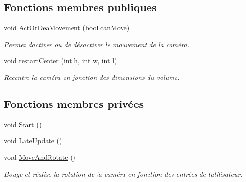 \subsection*{Fonctions membres publiques}
\begin{DoxyCompactItemize}
\item 
void \mbox{\hyperlink{class_camera_control_a879e70766aaa6eec8be532ab6712dd6b}{Act\+Or\+Dea\+Movement}} (bool \mbox{\hyperlink{class_camera_control_a0c3fa77bacbeb5a6735e6d572dbbce67}{can\+Move}})
\begin{DoxyCompactList}\small\item\em Permet d\textquotesingle{}activer ou de désactiver le mouvement de la caméra. \end{DoxyCompactList}\item 
void \mbox{\hyperlink{class_camera_control_ab7238445e22d5a0d5c2f620f1ad46fa2}{restart\+Center}} (int \mbox{\hyperlink{class_camera_control_aee06e1c0a46ffd42fcd8abe1c2f5a40a}{h}}, int \mbox{\hyperlink{class_camera_control_a4080a1d529cac09e1384bb0420ba87d3}{w}}, int \mbox{\hyperlink{class_camera_control_a0e883a505f663ed202947cb60995ded6}{l}})
\begin{DoxyCompactList}\small\item\em Recentre la caméra en fonction des dimensions du volume. \end{DoxyCompactList}\end{DoxyCompactItemize}
\subsection*{Fonctions membres privées}
\begin{DoxyCompactItemize}
\item 
void \mbox{\hyperlink{class_camera_control_af93c098f6ebf3501a41912d88accc1f2}{Start}} ()
\item 
void \mbox{\hyperlink{class_camera_control_a93058e0f26583cc7355f31467287d374}{Late\+Update}} ()
\item 
void \mbox{\hyperlink{class_camera_control_a408c4548730cdc6b96c177898f222635}{Move\+And\+Rotate}} ()
\begin{DoxyCompactList}\small\item\em Bouge et réalise la rotation de la caméra en fonction des entrées de l\textquotesingle{}utilisateur. \end{DoxyCompactList}\end{DoxyCompactItemize}
